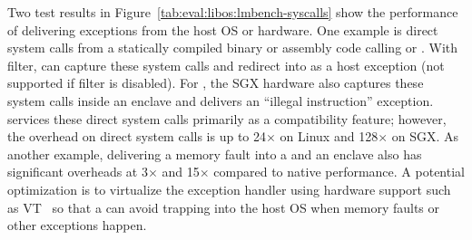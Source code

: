 Two test results in Figure~\ref{tab:eval:libos:lmbench-syscalls}
show the performance of delivering exceptions from the host OS or hardware.
One example is direct system calls from a statically
compiled binary
or assembly code calling  or .
With \seccomp{} filter,
\graphene{} can capture these system calls and redirect into \thelibos{} as a host exception (not supported if \seccomp{} filter is disabled).
For \graphenesgx{},
the SGX hardware also captures these system calls
inside an enclave
and delivers an
``illegal instruction'' exception.
\graphene{} services these direct system calls primarily as a compatibility feature;
however, the overhead on direct system calls
is up to 24$\times$ on Linux and 128$\times$ on SGX.
As another example,
delivering a memory fault
into a \picoproc{} and an enclave also has significant overheads at 3$\times$ and 15$\times$ compared to native performance.
A potential optimization
is to virtualize the exception handler using hardware support such as VT~\cite{VT} so that a \libos{} can avoid trapping
into the host OS
when memory faults or other exceptions happen.















